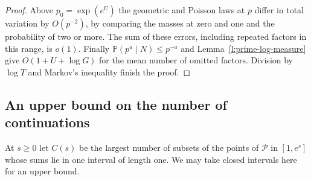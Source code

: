\documentclass[11pt]{article}
\numberwithin{equation}{section}
\newcommand{\PP}{\mathbb P}
\begin{document}
\begin{proof}
Above $p_0=\exp(e^U)$ the geometric and Poisson laws at $p$ differ
in total variation by $O(p^{-2})$, by comparing the masses at zero
and one and the probability of two or more. The sum of these errors,
including repeated factors in this range, is $o(1)$. Finally
$\PP(p^a\mid N)\le p^{-a}$ and Lemma~\ref{l:prime-log-measure}
give $O(1+U+\log G)$ for the mean number of omitted factors.
Division by $\log T$ and Markov's inequality finish the proof.
\end{proof}

\subsection{An upper bound on the number of continuations}

At $s\ge0$ let $C(s)$ be the largest number of subsets of the
points of $\mathcal P$ in $[1,e^s]$ whose sums lie in one interval
of length one. We may take closed intervals here for an upper bound.
\end{document}
